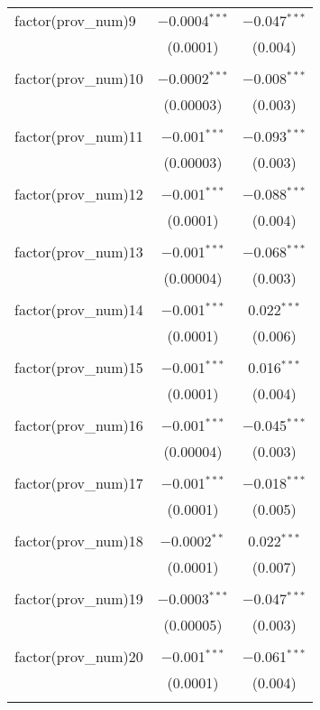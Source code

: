 \begin{table}[ht!]
\begin{tabular}{@{\extracolsep{5pt}}lcc}
 factor(prov\_num)9 & $-$0.0004$^{***}$ & $-$0.047$^{***}$ \\ 
  & (0.0001) & (0.004) \\ 
  & & \\ 
 factor(prov\_num)10 & $-$0.0002$^{***}$ & $-$0.008$^{***}$ \\ 
  & (0.00003) & (0.003) \\ 
  & & \\ 
 factor(prov\_num)11 & $-$0.001$^{***}$ & $-$0.093$^{***}$ \\ 
  & (0.00003) & (0.003) \\ 
  & & \\ 
 factor(prov\_num)12 & $-$0.001$^{***}$ & $-$0.088$^{***}$ \\ 
  & (0.0001) & (0.004) \\ 
  & & \\ 
 factor(prov\_num)13 & $-$0.001$^{***}$ & $-$0.068$^{***}$ \\ 
  & (0.00004) & (0.003) \\ 
  & & \\ 
 factor(prov\_num)14 & $-$0.001$^{***}$ & 0.022$^{***}$ \\ 
  & (0.0001) & (0.006) \\ 
  & & \\ 
 factor(prov\_num)15 & $-$0.001$^{***}$ & 0.016$^{***}$ \\ 
  & (0.0001) & (0.004) \\ 
  & & \\ 
 factor(prov\_num)16 & $-$0.001$^{***}$ & $-$0.045$^{***}$ \\ 
  & (0.00004) & (0.003) \\ 
  & & \\ 
 factor(prov\_num)17 & $-$0.001$^{***}$ & $-$0.018$^{***}$ \\ 
  & (0.0001) & (0.005) \\ 
  & & \\ 
 factor(prov\_num)18 & $-$0.0002$^{**}$ & 0.022$^{***}$ \\ 
  & (0.0001) & (0.007) \\ 
  & & \\ 
 factor(prov\_num)19 & $-$0.0003$^{***}$ & $-$0.047$^{***}$ \\ 
  & (0.00005) & (0.003) \\ 
  & & \\ 
 factor(prov\_num)20 & $-$0.001$^{***}$ & $-$0.061$^{***}$ \\ 
  & (0.0001) & (0.004) \\ 
  & & \\ 

\end{tabular}
\end{table}
